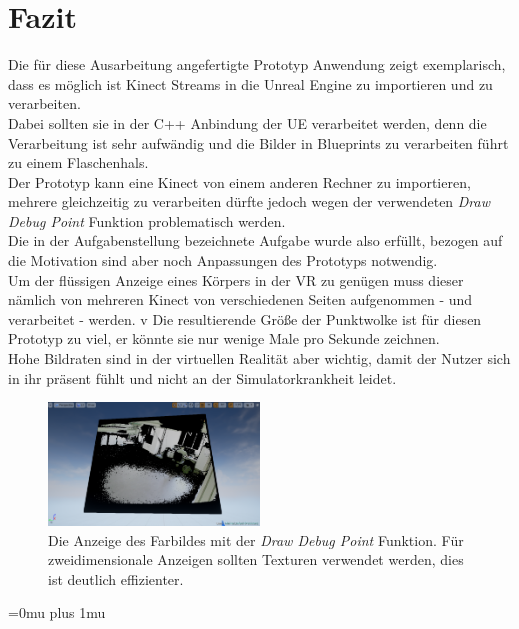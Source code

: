 \documentclass[a4paper]{IEEEtran}
\begin{document}
	


\section{Fazit}
	Die für diese Ausarbeitung angefertigte Prototyp Anwendung zeigt exemplarisch, dass es möglich ist Kinect Streams in die Unreal Engine zu importieren und zu verarbeiten.\\
	Dabei sollten sie in der C++ Anbindung der UE verarbeitet werden, denn die Verarbeitung ist sehr aufwändig und die Bilder in Blueprints zu verarbeiten führt zu einem Flaschenhals.\\
	Der Prototyp kann eine Kinect von einem anderen Rechner zu importieren, mehrere gleichzeitig zu verarbeiten dürfte jedoch wegen der verwendeten {\textit{Draw Debug Point}} Funktion problematisch werden. \\
	Die in der Aufgabenstellung bezeichnete Aufgabe wurde also erfüllt, bezogen auf die Motivation sind aber noch Anpassungen des Prototyps notwendig.\\
	Um der flüssigen Anzeige eines Körpers in der VR zu genügen muss dieser nämlich von mehreren Kinect von verschiedenen Seiten aufgenommen - und verarbeitet - werden. v
	Die resultierende Größe der Punktwolke ist für diesen Prototyp zu viel, er könnte sie nur wenige Male pro Sekunde zeichnen. \\
	Hohe Bildraten sind in der virtuellen Realität aber wichtig, damit der Nutzer sich in ihr präsent fühlt und nicht an der Simulatorkrankheit leidet. \\[0.5cm]
	
	\begin{figure}[!h]
    	\centering
		\includegraphics[width=0.5\textwidth]{img/2DColor}
	    \caption{Die Anzeige des Farbildes mit der {\textit{Draw Debug Point}} Funktion. Für zweidimensionale Anzeigen sollten Texturen verwendet werden, dies ist deutlich effizienter.}
    	\label{2DColor}
	\end{figure} 
	


\Urlmuskip=0mu plus 1mu\relax


\end{document}
